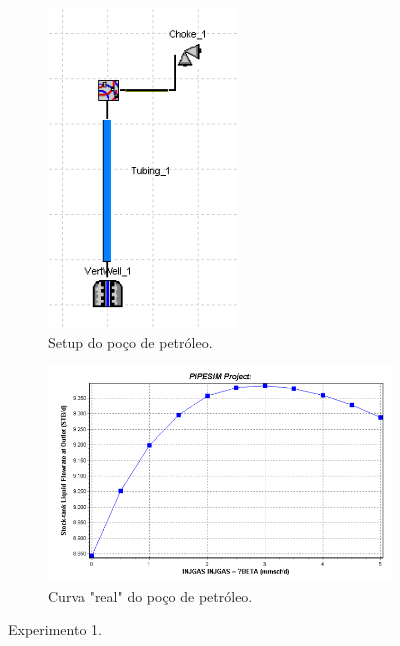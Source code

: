 \begin{figure}
\centering
\begin{subfigure}{.4\textwidth}
  \centering
  \includegraphics[height=1\linewidth]{figs/setup1.png}
  \caption{Setup do poço de petróleo.}
  \label{fig:setup1_dia}
\end{subfigure}%
\begin{subfigure}{.6\textwidth}
  \centering
  \includegraphics[height=0.7\linewidth]{figs/truth1.png}
  \caption{Curva "real" do poço de petróleo.}
  \label{fig:truth1}
\end{subfigure}
\caption{Experimento 1.}
\label{fig:setup1}
\end{figure}

